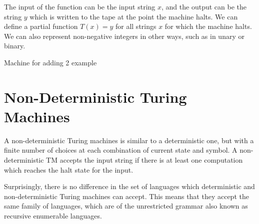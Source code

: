 The input of the function can be the input string $x$, and the output can be the string $y$ which is written to the tape
 at the point the machine halts. We can define a partial function $T(x) = y$ for all strings $x$ for which the machine
 halts. We can also represent non-negative integers in other ways, such as in unary or binary.

{\Huge Machine for adding 2 example}

\section*{Non-Deterministic Turing Machines}

A non-deterministic Turing machines is similar to a deterministic one, but with a finite number of choices at each
 combination of current state and symbol. A non-deterministic TM accepts the input string if there is at least one
 computation which reaches the halt state for the input.

Surprisingly, there is no difference in the set of languages which deterministic and non-deterministic Turing machines
 can accept. This means that they accept the same family of languages, which are of the unrestricted grammar also known
 as recursive enumerable languages.